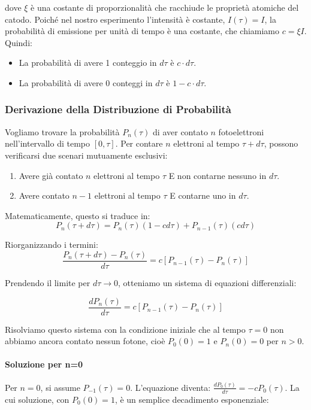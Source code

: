dove $\xi$ è una costante di proporzionalità che racchiude le proprietà atomiche del catodo.
Poiché nel nostro esperimento l'intensità è costante, $I(\tau) = I$, la probabilità di emissione per unità di tempo è una costante, che chiamiamo $c = \xi I$. Quindi:
\begin{itemize}
    \item La probabilità di avere 1 conteggio in $d\tau$ è $c \cdot d\tau$.
    \item La probabilità di avere 0 conteggi in $d\tau$ è $1 - c \cdot d\tau$.
\end{itemize}

\subsubsection*{Derivazione della Distribuzione di Probabilità}
Vogliamo trovare la probabilità $P_n(\tau)$ di aver contato $n$ fotoelettroni nell'intervallo di tempo $[0, \tau]$.
Per contare $n$ elettroni al tempo $\tau+d\tau$, possono verificarsi due scenari mutuamente esclusivi:
\begin{enumerate}
    \item Avere già contato $n$ elettroni al tempo $\tau$ E non contarne nessuno in $d\tau$.
    \item Avere contato $n-1$ elettroni al tempo $\tau$ E contarne uno in $d\tau$.
\end{enumerate}

Matematicamente, questo si traduce in:
\begin{equation}
 P_n(\tau+d\tau) = P_n(\tau)(1 - c d\tau) + P_{n-1}(\tau)(c d\tau)
\end{equation}

Riorganizzando i termini:
\begin{equation}
 \frac{P_n(\tau+d\tau) - P_n(\tau)}{d\tau} = c [P_{n-1}(\tau) - P_n(\tau)]
\end{equation}

Prendendo il limite per $d\tau \to 0$, otteniamo un sistema di equazioni differenziali:

\begin{equation}
 \frac{dP_n(\tau)}{d\tau} = c [P_{n-1}(\tau) - P_n(\tau)]
\end{equation}

Risolviamo questo sistema con la condizione iniziale che al tempo $\tau=0$ non abbiamo ancora contato nessun fotone, cioè $P_0(0)=1$ e $P_n(0)=0$ per $n>0$.

\paragraph{Soluzione per n=0}
Per $n=0$, si assume $P_{-1}(\tau)=0$. L'equazione diventa:
$\frac{dP_0(\tau)}{d\tau} = -c P_0(\tau)$.
La cui soluzione, con $P_0(0)=1$, è un semplice decadimento esponenziale:


